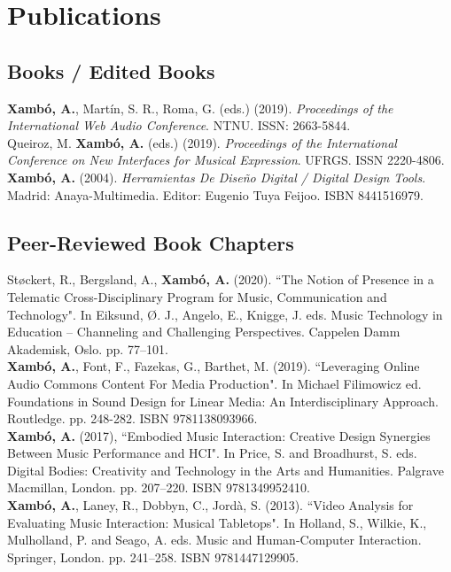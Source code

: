 \documentclass[10pt, a4paper]{article}
\newcommand{\years}[1]{\marginnote{\scriptsize #1}}
\begin{document}
{\section*{Publications}

\subsection*{Books / Edited Books}
\noindent

\years{2020}\textbf{Xambó, A.},  Martín, S. R., Roma, G. (eds.) (2019). \emph{Proceedings of the International Web Audio Conference}. NTNU. ISSN: 2663-5844.\\
\years{2019}Queiroz, M. \textbf{Xambó, A.} (eds.) (2019). \emph{Proceedings of the International Conference on New Interfaces for Musical Expression}. UFRGS. ISSN 2220-4806.\\
\years{2004}\textbf{Xambó, A.} (2004). \emph{Herramientas De Diseño Digital / Digital Design Tools}. Madrid: Anaya-Multimedia. Editor: Eugenio Tuya Feijoo. ISBN 8441516979.

\subsection*{Peer-Reviewed Book Chapters}
\noindent

\years{2020}Støckert, R., Bergsland, A., \textbf{Xambó, A.} (2020). “The Notion of Presence in a Telematic Cross-Disciplinary Program for Music, Communication and Technology". In Eiksund, Ø. J., Angelo, E., Knigge, J. eds. Music Technology in Education -- Channeling and Challenging Perspectives. Cappelen Damm Akademisk, Oslo. pp. 77--101.\\
\years{2019}\textbf{Xambó, A.}, Font, F., Fazekas, G., Barthet, M. (2019). “Leveraging Online Audio Commons Content For Media Production". In Michael Filimowicz ed. Foundations in Sound Design for Linear Media: An Interdisciplinary Approach. Routledge. pp. 248-282. ISBN 9781138093966.\\
\years{2016}\textbf{Xambó, A.} (2017), “Embodied Music Interaction: Creative Design Synergies Between Music Performance and HCI". In Price, S. and Broadhurst, S. eds. Digital Bodies: Creativity and Technology in the Arts and Humanities. Palgrave Macmillan, London. pp. 207--220. ISBN 9781349952410.\\
\years{2013}\textbf{Xambó, A.}, Laney, R., Dobbyn, C., Jordà, S. (2013). “Video Analysis for Evaluating Music Interaction: Musical Tabletops". In Holland, S., Wilkie, K., Mulholland, P. and Seago, A. eds. Music and Human-Computer Interaction. Springer, London. pp. 241--258. ISBN 9781447129905.


}
\end{document}
